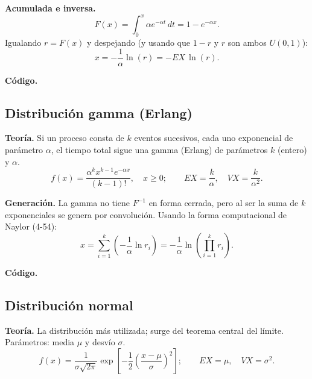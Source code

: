 \documentclass[11pt]{article}
\begin{document}
\textbf{Acumulada e inversa.}
\begin{equation}
F(x) = \int_0^x \alpha e^{-\alpha t}\,dt = 1 - e^{-\alpha x}.
\end{equation}
Igualando $r = F(x)$ y despejando (y usando que $1-r$ y $r$ son ambos
$U(0,1)$):
\begin{equation}
x = -\frac{1}{\alpha}\ln(r) = -EX\,\ln(r).
\end{equation}

\textbf{C\'odigo.}


\subsection{Distribuci\'on gamma (Erlang)}

\textbf{Teor\'ia.} Si un proceso consta de $k$ eventos sucesivos, cada uno
exponencial de par\'ametro $\alpha$, el tiempo total sigue una gamma
(Erlang) de par\'ametros $k$ (entero) y $\alpha$.
\begin{equation}
f(x) = \frac{\alpha^k x^{k-1} e^{-\alpha x}}{(k-1)!}, \quad x \ge 0;
\qquad EX = \frac{k}{\alpha}, \quad VX = \frac{k}{\alpha^2}.
\end{equation}

\textbf{Generaci\'on.} La gamma no tiene $F^{-1}$ en forma cerrada, pero al
ser la suma de $k$ exponenciales se genera por convoluci\'on. Usando la
forma computacional de Naylor (4-54):
\begin{equation}
x = \sum_{i=1}^{k} \left(-\frac{1}{\alpha}\ln r_i\right)
  = -\frac{1}{\alpha}\ln\!\left(\prod_{i=1}^{k} r_i\right).
\end{equation}

\textbf{C\'odigo.}


\subsection{Distribuci\'on normal}

\textbf{Teor\'ia.} La distribuci\'on m\'as utilizada; surge del teorema
central del l\'imite. Par\'ametros: media $\mu$ y desv\'io $\sigma$.
\begin{equation}
f(x) = \frac{1}{\sigma\sqrt{2\pi}}
       \exp\!\left[-\frac{1}{2}\left(\frac{x-\mu}{\sigma}\right)^2\right];
\qquad EX = \mu, \quad VX = \sigma^2.
\end{equation}
\end{document}

